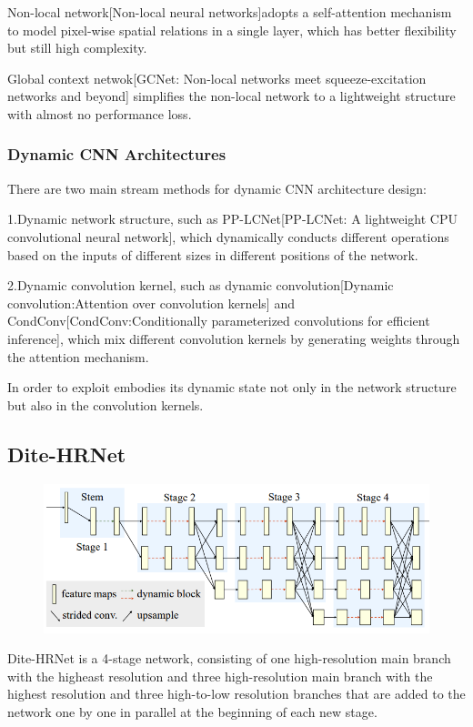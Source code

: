 \documentclass[11pt]{article}
\begin{document}
Non-local network[Non-local neural networks]adopts a self-attention mechanism to model pixel-wise spatial relations in a single layer, which has better flexibility but still high complexity.

Global context netwok[GCNet: Non-local networks meet squeeze-excitation networks and beyond] simplifies the non-local network to a lightweight structure with almost no performance loss.
\subsubsection{Dynamic CNN Architectures}
There are two main stream methods for dynamic CNN architecture design:

1.Dynamic network structure, such as PP-LCNet[PP-LCNet: A lightweight CPU convolutional neural network], which dynamically conducts different operations based on the inputs of different sizes in different positions of the network.

2.Dynamic convolution kernel, such as dynamic convolution[Dynamic convolution:Attention over convolution kernels] and CondConv[CondConv:Conditionally parameterized convolutions for efficient inference], which mix different convolution kernels by generating weights through the attention mechanism.

In order to exploit embodies its dynamic state not only in the network structure but also in the convolution kernels.

\subsection{Dite-HRNet}
\begin{figure}[H]
	\centering
	\includegraphics[scale=0.5]{94}
\end{figure}

Dite-HRNet is a 4-stage network, consisting of one high-resolution main branch with the higheast resolution and three high-resolution main branch with the highest resolution and three high-to-low resolution branches that are added to the network one by one in parallel at the beginning of each new stage.
\end{document}

